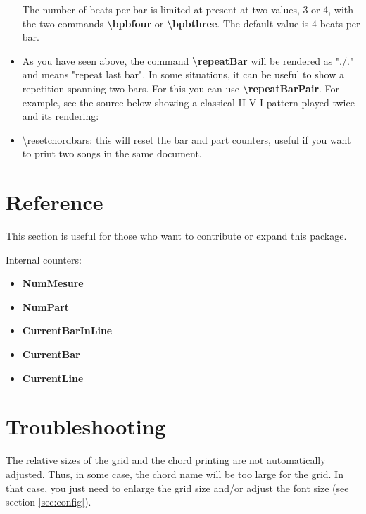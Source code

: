 \documentclass[11pt]{article}
\newcommand{\btt}{\bfseries \ttfamily }
\newcommand{\tbs}{\textbackslash{}}
\begin{document}
\begin{itemize}
The number of beats per bar is limited at present at two values, 3 or 4, with the two commands
{\btt \tbs bpbfour} or {\btt \tbs bpbthree}.
The default value is 4 beats per bar.

\item As you have seen above, the command {\btt \tbs repeatBar} will be rendered as "./."
and means "repeat last bar".
In some situations, it can be useful to show a repetition spanning two bars.
For this you can use {\btt \tbs repeatBarPair}.
For example, see the source below showing a classical II-V-I pattern played twice and its rendering:

\vspace{1em}
\noindent
\begin{minipage}{0.45\textwidth}

\end{minipage}
%
\begin{minipage}{0.42\textwidth}
\countbarsNo

\end{minipage}

\item {\ttfamily \textbackslash resetchordbars}: this will reset the bar and part counters, useful if you want to print two songs in the same document.
\end{itemize}


\section{Reference}

This section is useful for those who want to contribute or expand this package.

Internal counters:

\begin{itemize}
\item {\btt NumMesure}
\item {\btt NumPart}
\item {\btt CurrentBarInLine}
\item {\btt CurrentBar}
\item {\btt CurrentLine}
\end{itemize}

\section{Troubleshooting}

The relative sizes of the grid and the chord printing are not automatically adjusted.
Thus, in some case, the chord name will be too large for the grid.
In that case, you just need to enlarge the grid size and/or adjust the font size (see section \ref {sec:config}).
\end{document}
